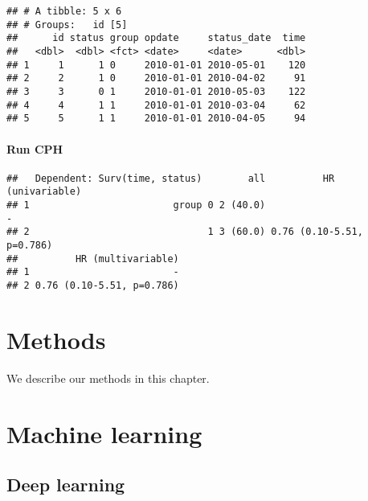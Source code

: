 \documentclass[]{book}
\newenvironment{Shaded}{\begin{snugshade}}{\end{snugshade}}
\newcommand{\KeywordTok}[1]{\textcolor[rgb]{0.13,0.29,0.53}{\textbf{#1}}}
\newcommand{\NormalTok}[1]{#1}
\newcommand{\OperatorTok}[1]{\textcolor[rgb]{0.81,0.36,0.00}{\textbf{#1}}}
\newcommand{\StringTok}[1]{\textcolor[rgb]{0.31,0.60,0.02}{#1}}
\begin{document}
\begin{verbatim}
## # A tibble: 5 x 6
## # Groups:   id [5]
##      id status group opdate     status_date  time
##   <dbl>  <dbl> <fct> <date>     <date>      <dbl>
## 1     1      1 0     2010-01-01 2010-05-01    120
## 2     2      1 0     2010-01-01 2010-04-02     91
## 3     3      0 1     2010-01-01 2010-05-03    122
## 4     4      1 1     2010-01-01 2010-03-04     62
## 5     5      1 1     2010-01-01 2010-04-05     94
\end{verbatim}

\hypertarget{run-cph}{%
\subsubsection{Run CPH}\label{run-cph}}

\begin{Shaded}
\end{Shaded}

\begin{verbatim}
##   Dependent: Surv(time, status)        all          HR (univariable)
## 1                         group 0 2 (40.0)                         -
## 2                               1 3 (60.0) 0.76 (0.10-5.51, p=0.786)
##          HR (multivariable)
## 1                         -
## 2 0.76 (0.10-5.51, p=0.786)
\end{verbatim}

\hypertarget{methods}{%
\chapter{Methods}\label{methods}}

We describe our methods in this chapter.

\hypertarget{machine-learning}{%
\chapter{Machine learning}\label{machine-learning}}

\hypertarget{deep-learning}{%
\section{Deep learning}\label{deep-learning}}
\end{document}
